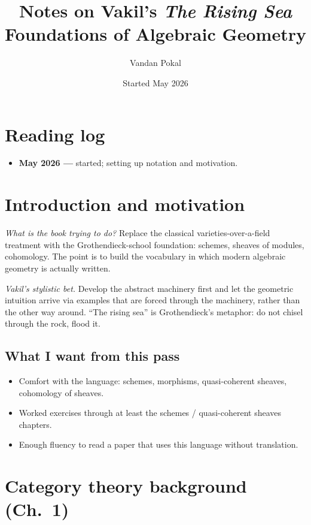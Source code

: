 \documentclass[11pt]{article}
\title{Notes on Vakil's \emph{The Rising Sea} \\[2pt]
       \large Foundations of Algebraic Geometry}
\author{Vandan Pokal}
\date{Started May 2026}
\theoremstyle{definition}
\theoremstyle{remark}
\begin{document}
\maketitle

\tableofcontents

\section*{Reading log}

\begin{itemize}
  \item \textbf{May 2026 ---} started; setting up notation and motivation.
\end{itemize}

\section{Introduction and motivation}

\textit{What is the book trying to do?} Replace the classical
varieties-over-a-field treatment with the Grothendieck-school
foundation: schemes, sheaves of modules, cohomology. The point is to
build the vocabulary in which modern algebraic geometry is actually
written.

\textit{Vakil's stylistic bet.} Develop the abstract machinery first
and let the geometric intuition arrive via examples that are forced
through the machinery, rather than the other way around. ``The rising
sea'' is Grothendieck's metaphor: do not chisel through the rock,
flood it.

\subsection*{What I want from this pass}

\begin{itemize}
  \item Comfort with the language: schemes, morphisms, quasi-coherent sheaves, cohomology of sheaves.
  \item Worked exercises through at least the schemes / quasi-coherent sheaves chapters.
  \item Enough fluency to read a paper that uses this language without translation.
\end{itemize}

\section{Category theory background (Ch.~1)}
\end{document}
